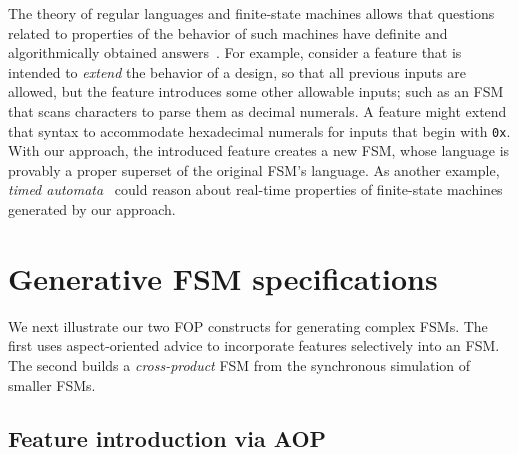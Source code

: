 \documentclass[sigplan,anonymous,review]{acmart}
\begin{document}
The theory of regular languages and finite-state machines allows that questions related to properties of the behavior of such machines have definite and algorithmically obtained answers~\cite{sipser}. For example, consider a feature that is intended to \emph{extend} the behavior of a design, so that all previous inputs are allowed, but the feature introduces some other allowable inputs; such as an FSM that scans characters to parse them as decimal numerals.  A feature might extend that syntax to accommodate hexadecimal numerals for inputs that begin with \texttt{0x}.  With our approach, the introduced feature creates a new FSM, whose language is provably a proper superset of the original FSM's language.  As another example, \emph{timed automata}~\cite{10.1145/2518102} could reason about real-time properties of finite-state machines generated by our approach.   

\section{Generative FSM specifications}

We next illustrate our two FOP constructs for generating complex FSMs.  The first uses aspect-oriented advice to incorporate features selectively into an FSM.  The second builds a \emph{cross-product} FSM from the synchronous simulation of smaller FSMs.

\subsection{Feature introduction via AOP}\label{sec:vend}
\end{document}
